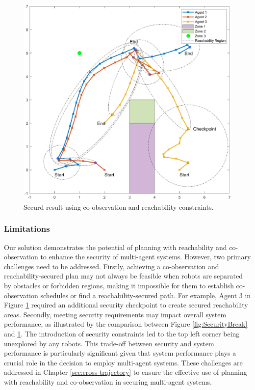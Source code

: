\documentclass[10pt,twocolumn,twoside]{IEEEtran}
\begin{document}
\begin{figure}
\begin{center}
  \includegraphics[width=0.6\linewidth,trim =1cm 1.5cm 1cm 1.5cm, clip]{FinalResult}
  \caption{Securd result using co-observation and reachability constraints.}
\label{fig:ReachabilitySimulation}
\end{center}  
\end{figure}



\subsubsection{Limitations}\label{sec:reachability-discussion}
Our solution demonstrates the potential of planning with reachability and co-observation to enhance the security of multi-agent systems. However, two primary challenges need to be addressed. Firstly, achieving a co-observation and reachability-secured plan may not always be feasible when robots are separated by obstacles or forbidden regions, making it impossible for them to establish co-observation schedules or find a reachability-secured path. For example, Agent 3 in Figure \ref{fig:ReachabilitySimulation} required an additional security checkpoint to create secured reachability areas. Secondly, meeting security requirements may impact overall system performance, as illustrated by the comparison between Figure \ref{fig:SecurityBreak} and \ref{fig:ReachabilitySimulation}. The introduction of security constraints led to the top left corner being unexplored by any robots. This trade-off between security and system performance is particularly significant given that system performance plays a crucial role in the decision to employ multi-agent systems. These challenges are addressed in Chapter \ref{sec:cross-trajectory} to ensure the effective use of planning with reachability and co-observation in securing multi-agent systems.
\end{document}
